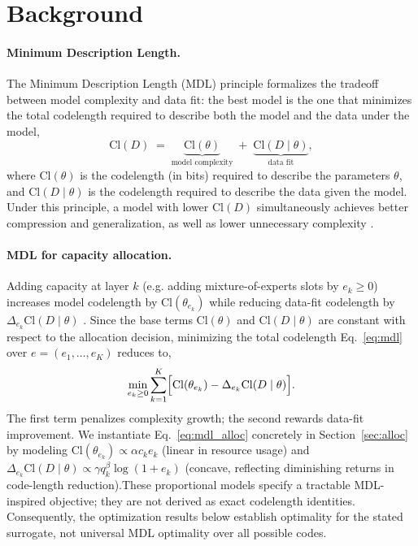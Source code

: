 \documentclass[accepted]{uai2026}%
\theoremstyle{remark}%
\begin{document}
\section{Background}
\label{sec:background}

\paragraph{Minimum Description Length.}
The Minimum Description Length (MDL) principle \citep{Rissanen1978Modeling}
formalizes the tradeoff between model complexity and data fit:
the best model is the one that minimizes the total codelength required
to describe both the model and the data under the model,
\begin{equation}
  \label{eq:mdl}
  \mathrm{Cl}(D)
  \;=\;
  \underbrace{\mathrm{Cl}(\theta)}_{\text{model complexity}}
  \;+\;
  \underbrace{\mathrm{Cl}(D \mid \theta)}_{\text{data fit}},
\end{equation}
where $\mathrm{Cl}(\theta)$ is the codelength (in bits) required to
describe the parameters $\theta$, and $\mathrm{Cl}(D\mid\theta)$ is
the codelength required to describe the data given the model.
Under this principle, a model with lower $\mathrm{Cl}(D)$ simultaneously
achieves better compression and generalization, as well as lower unnecessary
complexity \citep{Lotfi2023NonVacuousGB, Prada2025BridgingPC}.

\paragraph{MDL for capacity allocation.}
Adding capacity at layer $k$ (e.g. adding
mixture-of-experts slots by $e_k \ge 0$) increases model codelength by
$\mathrm{Cl}(\theta_{e_k})$ while reducing data-fit codelength by
$\Delta_{e_k}\mathrm{Cl}(D\mid\theta)$ \citep{pac-mdl}.
Since the base terms $\mathrm{Cl}(\theta)$ and $\mathrm{Cl}(D\mid\theta)$
are constant with respect to the allocation decision, minimizing the total
codelength Eq.~\eqref{eq:mdl} over $e = (e_1,\ldots,e_K)$ reduces to,
\begin{equation}
  \label{eq:mdl_alloc}
  \min_{e_k \ge 0}
  \sum_{k=1}^{K}
  \Bigl[
    \mathrm{Cl}(\theta_{e_k})
    -
    \Delta_{e_k}\mathrm{Cl}(D \mid \theta)
  \Bigr].
\end{equation}
The first term penalizes complexity growth; the second rewards data-fit
improvement. We instantiate Eq.~\eqref{eq:mdl_alloc} concretely in
Section~\ref{sec:alloc} by modeling $\mathrm{Cl}(\theta_{e_k}) \propto \alpha c_k e_k$
(linear in resource usage) and
$\Delta_{e_k}\mathrm{Cl}(D\mid\theta) \propto \gamma q_k^\beta \log(1+e_k)$
(concave, reflecting diminishing returns in code-length reduction).These proportional models specify a tractable MDL-inspired objective; they are not derived as exact codelength identities. Consequently, the optimization results below establish optimality for the stated surrogate, not universal MDL optimality over all possible codes.
\end{document}
